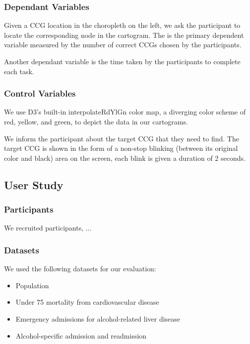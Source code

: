 \subsubsection{Dependant Variables}

 Given a CCG location in the choropleth on the left, we ask the participant to locate the corresponding node in the cartogram. The is the primary dependent variable measured by the number of correct CCGs chosen by the participants.

 Another dependant variable is the time taken by the participants to complete each task.

\subsubsection{Control Variables}
 We use D3's built-in interpolateRdYlGn color map, a diverging color scheme of red, yellow, and green, to depict the data in our cartograms.

 We inform the participant about the target CCG that they need to find. The target CCG is shown in the form of a non-stop blinking (between its original color and black) area on the screen, each blink is given a duration of 2 seconds.

\subsection{User Study}

\subsubsection{Participants}

We recruited \pCount participants, ...

\subsubsection{Datasets}

We used the following datasets for our evaluation:

\begin{itemize}
    \item Population
    \item Under 75 mortality from cardiovascular disease
    \item Emergency admissions for alcohol-related liver disease
    \item Alcohol-specific admission and readmission
\end{itemize}

